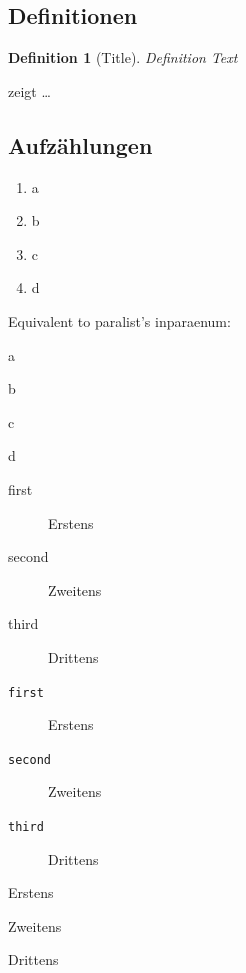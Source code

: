 \documentclass[
  fontsize=10pt,
  numbers=noenddot,
  english,  %
  paper=a5,
  twoside,  %
  DIV=calc,
  headings=small,
  bibliography=totoc,
  listof=totoc,
  draft=false
]{scrbook}
\theoremstyle{break}
\newtheorem{definition}{Definition}[chapter]
\begin{document}
\subsection{Definitionen}
\begin{definition}[Title]
  \label{def:def1}
  Definition Text
\end{definition}

 zeigt \ldots

\subsection{Aufzählungen}

\begin{enumerate}[label=\alph*)]
  \item a
  \item b
  \item c
  \item d
\end{enumerate}

Equivalent to paralist's inparaenum:
\begin{enumerate*}[label=\alph*)]
  \item a
  \item b
  \item c
  \item d
\end{enumerate*}

\begin{description}
  \item[first] Erstens
  \item[second] Zweitens
  \item[third] Drittens
\end{description}

\begin{description}
  \item[\texttt{first}] Erstens
  \item[\texttt{second}] Zweitens
  \item[\texttt{third}] Drittens
\end{description}

\begin{description}[font=\ttfamily]
  \item[first] Erstens
  \item[second] Zweitens
  \item[third] Drittens
\end{description}
\end{document}
